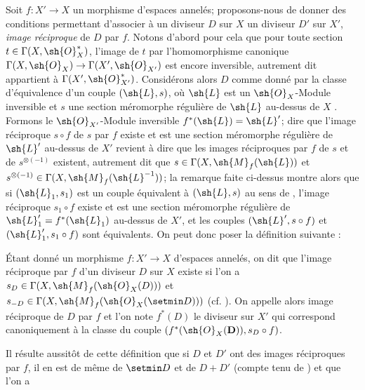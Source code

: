 \begin{env}[21.4.1]
Soit $f:X'\to X$ un morphisme d'espaces annelés;
proposons-nous de donner des conditions permettant d'associer à un diviseur $D$ sur $X$ un diviseur $D'$ sur $X'$, \emph{image réciproque} de $D$ par $f$.
Notons d'abord pour cela que pour toute section $t\in\Gamma(X,\sh{O}_X^*)$, l'image de $t$ par l'homomorphisme canonique $\Gamma(X,\sh{O}_X)\to\Gamma(X',\sh{O}_{X'})$ est encore inversible, autrement dit appartient à $\Gamma(X',\sh{O}_{X'}^*)$.
Considérons alors $D$ comme donné par la classe d'équivalence d'un couple $(\sh{L},s)$, où $\sh{L}$ est un $\sh{O}_X$-Module inversible et $s$ une section méromorphe régulière de $\sh{L}$ au-dessus de $X$ .
Formons le $\sh{O}_{X'}$-Module inversible $f^*(\sh{L})=\sh{L}'$;
dire que l'image réciproque $s\circ f$ de $s$ par $f$ existe  et est une section méromorphe régulière de $\sh{L}'$ au-dessus de $X'$ revient à dire que les images réciproques par $f$ de $s$ et de $s^{\otimes(-1)}$ existent, autrement dit que $s\in\Gamma(X,\sh{M}_f(\sh{L}))$ et $s^{\otimes(-1)}\in\Gamma(X,\sh{M}_f(\sh{L}^{-1}))$;
la remarque faite ci-dessus montre alors que si $(\sh{L}_1,s_1)$ est un couple équivalent à $(\sh{L},s)$ au sens de , l'image réciproque $s_1\circ f$ existe et est une section méromorphe régulière de $\sh{L}_1'=f^*(\sh{L}_1)$ au-dessus de $X'$, et les couples $(\sh{L}',s\circ f)$ et $(\sh{L}_1',s_1\circ f)$ sont équivalents.
On peut donc poser la définition suivante :
\end{env}

\begin{definition}[21.4.2]
Étant donné un morphisme $f:X'\to X$ d'espaces annelés, on dit que l'image réciproque par $f$ d'un diviseur $D$ sur $X$ existe si l'on a $s_D\in\Gamma(X,\sh{M}_f(\sh{O}_X(D)))$ et $s_{-D}\in\Gamma(X,\sh{M}_f(\sh{O}_X(\setmin D)))$ \textup{(cf. )}.
On appelle alors image réciproque de $D$ par $f$ et l'on note $f^*(D)$ le diviseur sur $X'$ qui correspond canoniquement  à la classe du couple $(f^*(\sh{O}_X(\mathbf{D})),s_D\circ f)$.
\end{definition}

Il résulte aussitôt de cette définition que si $D$ et $D'$ ont des images réciproques par $f$, il en est de même de $\setmin D$ et de $D+D'$ (compte tenu de ) et que l'on a
